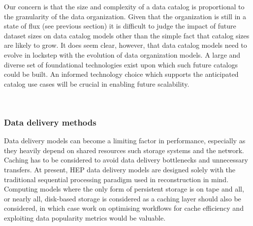 \documentclass[12pt,a4paper]{article}
\begin{document}
Our concern is that the size and complexity of a data catalog is
proportional to the granularity of the data organization. Given that the
organization is still in a state of flux (see previous section) it is
difficult to judge the impact of future dataset sizes on data catalog
models other than the simple fact that catalog sizes are likely to grow.
It does seem clear, however, that data catalog models need to evolve in
lockstep with the evolution of data organization models. A large and
diverse set of foundational technologies exist upon which such future
catalogs could be built. An informed technology choice which supports
the anticipated catalog use cases will be crucial in enabling future
scalability.

~

\subsubsection{Data delivery methods}\label{data-delivery-methods}

Data delivery models can become a limiting factor in performance,
especially as they heavily depend on shared resources such storage
systems and the network. Caching has to be considered to avoid data
delivery bottlenecks and unnecessary transfers. At present, HEP data
delivery models are designed solely with the traditional sequential
processing paradigm used in reconstruction in mind. Computing models
where the only form of persistent storage is on tape and all, or nearly
all, disk-based storage is considered as a caching layer should also be
considered, in which case work on optimising workflows for cache
efficiency and exploiting data popularity metrics would be valuable.

~
\end{document}
